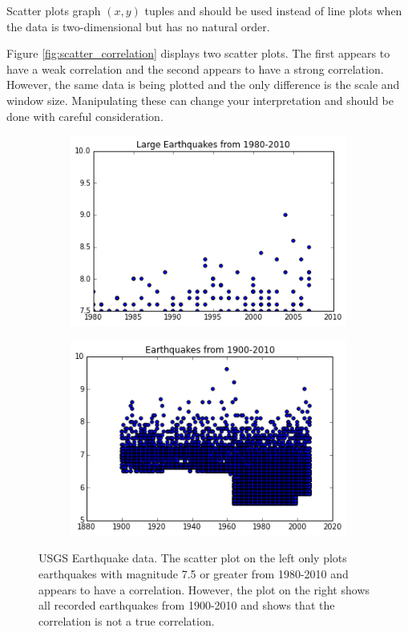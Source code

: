 Scatter plots graph $(x,y)$ tuples and should be used instead of line plots when the data is two-dimensional but has no natural order.

Figure \ref{fig:scatter_correlation} displays two scatter plots.
The first appears to have a weak correlation and the second appears to have a strong correlation.
However, the same data is being plotted and the only difference is the scale and window size.
Manipulating these can change your interpretation and should be done with careful consideration.

\begin{figure}[h]
\centering
\begin{subfigure}{.45\textwidth}
\centering
\includegraphics[width=\textwidth]{earthquake_zoomed.png}
\end{subfigure}
\begin{subfigure}{.45\textwidth}
\centering
\includegraphics[width=\textwidth]{earthquake_data.png}
\end{subfigure}
\caption{USGS Earthquake data. The scatter plot on the left only plots earthquakes with
magnitude 7.5 or greater from 1980-2010 and appears to have a correlation.
However, the plot on the right shows all recorded earthquakes from 1900-2010 and shows that the correlation
is not a true correlation.}
\label{fig:scatterquake}
\end{figure}

